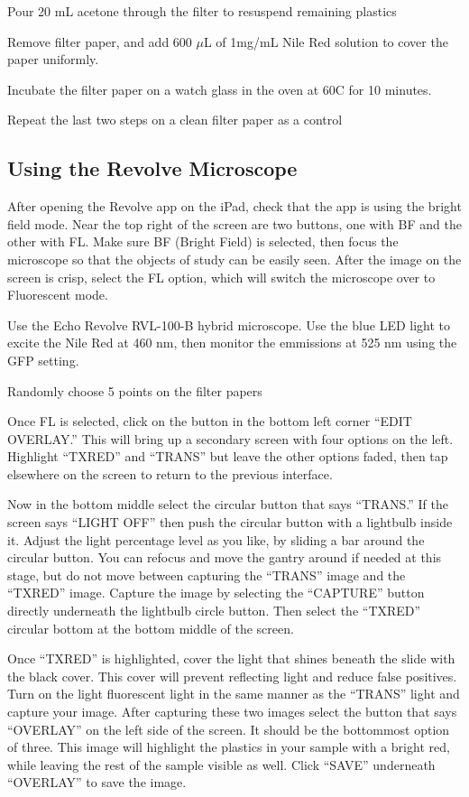 \documentclass[12pt]{../SOP4_alpha}\usepackage[]{graphicx}\usepackage[]{color}
\begin{document}
\NP Pour 20 mL acetone through the filter to resuspend remaining plastics

\NP Remove filter paper, and add 600 $\mu$L of 1mg/mL Nile Red solution to cover the paper uniformly.

\NP Incubate the filter paper on a watch glass in the oven at 60C for 10 minutes.

\NP Repeat the last two steps on a clean filter paper as a control
  

\subsection{Using the Revolve Microscope}

\NP After opening the Revolve app on the iPad, check that the app is using the bright field mode. Near the top right of the screen are two buttons, one with BF and the other with FL. Make sure BF (Bright Field) is selected, then focus the microscope so that the objects of study can be easily seen. After the image on the screen is crisp, select the FL option, which will switch the microscope over to Fluorescent mode. 

  \NP Use the Echo Revolve RVL-100-B hybrid microscope. Use the blue LED light to excite the Nile Red at 460 nm, then monitor the emmissions at 525 nm using the GFP setting.
  
  \NP Randomly choose 5 points on the filter papers


\NP Once FL is selected, click on the button in the bottom left corner ``EDIT OVERLAY.'' This will bring up a secondary screen with four options on the left. Highlight ``TXRED'' and “TRANS” but leave the other options faded, then tap elsewhere on the screen to return to the previous interface.

\NP Now in the bottom middle select the circular button that says ``TRANS.'' If the screen says ``LIGHT OFF'' then push the circular button with a lightbulb inside it. Adjust the light percentage level as you like, by sliding a bar around the circular button. You can refocus and move the gantry around if needed at this stage, but do not move between capturing the ``TRANS'' image and the ``TXRED'' image. Capture the image by selecting the ``CAPTURE'' button directly underneath the lightbulb circle button. Then select the ``TXRED'' circular bottom at the bottom middle of the screen.

\NP Once ``TXRED'' is highlighted, cover the light that shines beneath the slide with the black cover. This cover will prevent reflecting light and reduce false positives. Turn on the light fluorescent light in the same manner as the ``TRANS'' light and capture your image. After capturing these two images select the button that says ``OVERLAY'' on the left side of the screen. It should be the bottommost option of three. This image will highlight the plastics in your sample with a bright red, while leaving the rest of the sample visible as well. Click ``SAVE'' underneath ``OVERLAY'' to save the image.
\end{document}

